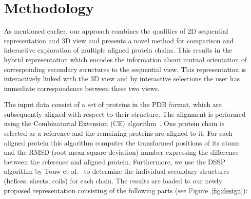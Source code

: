\documentclass[twocolumn]{bmcart}%
\begin{document}
\section*{Methodology}
As mentioned earlier, our approach combines the qualities of 2D sequential representation and 3D view and presents a novel method for comparison and interactive exploration of multiple aligned protein chains.
This results in the hybrid representation which encodes the information about mutual orientation of corresponding secondary structures to the sequential view.
This representation is interactively linked with the 3D view and by interactive selections the user has immediate correspondence between these two views.

The input data consist of a set of proteins in the PDB format, which are subsequently aligned with respect to their structure.
The alignment is performed using the Combinatorial Extension (CE) algorithm~\cite{Shindyalov1998}. 
One protein chain is selected as a reference and the remaining proteins are aligned to it.
For each aligned protein this algorithm computes the transformed positions of its atoms and the RMSD (root-mean-square deviation) number expressing the difference between the reference and aligned protein.  
Furthermore, we use the DSSP algorithm by Touw et al.~\cite{dssp} to determine the individual secondary structures (helices, sheets, coils) for each chain.
The results are loaded to our newly proposed representation consisting of the following parts (see Figure~\ref{fig:design}):
\end{document}
